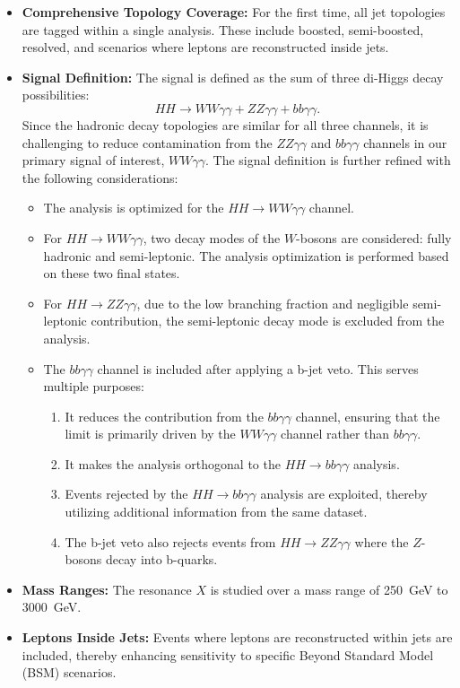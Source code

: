 \begin{itemize}
    \item \textbf{Comprehensive Topology Coverage:}
    For the first time, all jet topologies are tagged within a single analysis. These include boosted, semi-boosted, resolved, and scenarios where leptons are reconstructed inside jets.

    \item \textbf{Signal Definition:}
    The signal is defined as the sum of three di-Higgs decay possibilities:
    \[
    HH \to WW\gamma\gamma + ZZ\gamma\gamma + bb\gamma\gamma.
    \]
    Since the hadronic decay topologies are similar for all three channels, it is challenging to reduce contamination from the \(ZZ\gamma\gamma\) and \(bb\gamma\gamma\) channels in our primary signal of interest, \(WW\gamma\gamma\). The signal definition is further refined with the following considerations:
    \begin{itemize}
        \item The analysis is optimized for the \(HH \to WW\gamma\gamma\) channel.
        \item For \(HH \to WW\gamma\gamma\), two decay modes of the \(W\)-bosons are considered: fully hadronic and semi-leptonic. The analysis optimization is performed based on these two final states.
        \item For \(HH \to ZZ\gamma\gamma\), due to the low branching fraction and negligible semi-leptonic contribution, the semi-leptonic decay mode is excluded from the analysis.
        \item The \(bb\gamma\gamma\) channel is included after applying a b-jet veto. This serves multiple purposes:
        \begin{enumerate}
            \item It reduces the contribution from the \(bb\gamma\gamma\) channel, ensuring that the limit is primarily driven by the \(WW\gamma\gamma\) channel rather than \(bb\gamma\gamma\).
            \item It makes the analysis orthogonal to the \(HH \to bb\gamma\gamma\) analysis.
            \item Events rejected by the \(HH \to bb\gamma\gamma\) analysis are exploited, thereby utilizing additional information from the same dataset.
            \item The b-jet veto also rejects events from \(HH \to ZZ\gamma\gamma\) where the \(Z\)-bosons decay into b-quarks.
        \end{enumerate}
    \end{itemize}

    \item \textbf{Mass Ranges:}
    The resonance \(X\) is studied over a mass range of 250~GeV to 3000~GeV.

    \item \textbf{Leptons Inside Jets:}
    Events where leptons are reconstructed within jets are included, thereby enhancing sensitivity to specific Beyond Standard Model (BSM) scenarios.
\end{itemize}

